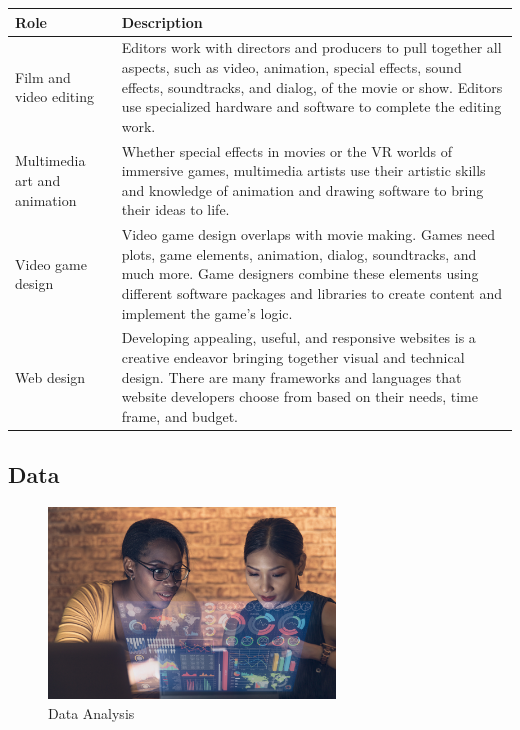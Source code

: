 \begin{table}[H]
	\begin{center}
		\begin{tabular}{p{1in}|p{3.4in}} 
			\textbf{Role} & \textbf{Description}\\
			\hline
			Film and video editing & Editors work with directors and producers to pull together all aspects, such as video, animation, special effects, sound effects, soundtracks, and dialog, of the movie or show. Editors use specialized hardware and software to complete the editing work.\\
			\hline
			Multimedia art and animation & Whether special effects in movies or the VR worlds of immersive games, multimedia artists use their artistic skills and knowledge of animation and drawing software to bring their ideas to life.\\
			\hline
			Video game design & Video game design overlaps with movie making. Games need plots, game elements, animation, dialog, soundtracks, and much more. Game designers combine these elements using different software packages and libraries to create content and implement the game's logic.\\
			\hline
			Web design & Developing appealing, useful, and responsive websites is a creative endeavor bringing together visual and technical design. There are many frameworks and languages that website developers choose from based on their needs, time frame, and budget.\\
			\hline
		\end{tabular}
	\end{center}
\end{table}


\subsection{Data}

\begin{figure}[H]
	\begin{center}
		\caption{Data Analysis}
		\vskip 4pt
		\includegraphics[height=2in]{images/careers/iStock-1364769258.small.jpg}
	\end{center}
\end{figure}

